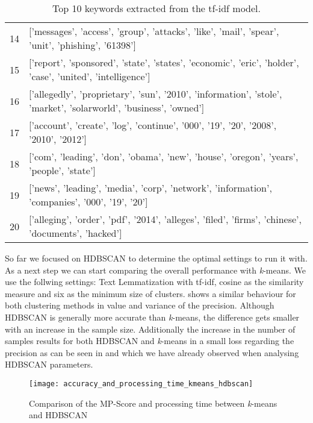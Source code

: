 \begin{table}[h]
{\begin{tabular}{rl}
            14 & ['messages', 'access', 'group', 'attacks', 'like', 'mail', 'spear', 'unit', 'phishing', '61398']                        \\
            15 & ['report', 'sponsored', 'state', 'states', 'economic', 'eric', 'holder', 'case', 'united', 'intelligence']              \\
            16 & ['allegedly', 'proprietary', 'sun', '2010', 'information', 'stole', 'market', 'solarworld', 'business', 'owned']        \\
            17 & ['account', 'create', 'log', 'continue', '000', '19', '20', '2008', '2010', '2012']                                     \\
            18 & ['com', 'leading', 'don', 'obama', 'new', 'house', 'oregon', 'years', 'people', 'state']                                \\
            19 & ['news', 'leading', 'media', 'corp', 'network', 'information', 'companies', '000', '19', '20']                          \\
            20 & ['alleging', 'order', 'pdf', '2014', 'alleges', 'filed', 'firms', 'chinese', 'documents', 'hacked']                     \\
        \hline
        \end{tabular}
        }
        \caption{Top 10 keywords extracted from the tf-idf model.}
        \label{tab:clustering_example_features}
\end{table}

So far we focused on HDBSCAN to determine the optimal settings to run it with.
As a next step we can start comparing the overall performance with \textit{k}-means.
We use the follwing settings: Text Lemmatization with tf-idf,
cosine as the similarity measure and six as the minimum size of clusters.
 shows a similar behaviour
for both clustering methods in value and variance of the precision.
Although HDBSCAN is generally more accurate than \textit{k}-means,
the difference gets smaller with an increase in the sample size.
Additionally the increase in the number of samples results for both HDBSCAN
and \textit{k}-means in a small loss regarding the precision as can be seen in 
and which we have already observed when analysing HDBSCAN parameters.

\begin{figure}[h]
    \centering
    \texttt{[image: accuracy\_and\_processing\_time\_kmeans\_hdbscan]}
    \caption{Comparison of the MP-Score and processing time between \textit{k}-means and HDBSCAN}
    \label{fig:precision_and_processing_time_kmeans_hdbscan}
\end{figure}

